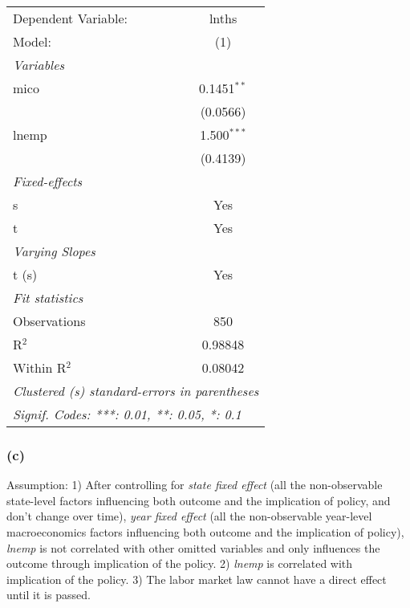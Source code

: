 \documentclass[
]{article}
\begin{document}
\begin{center}\begingroup\centering\begin{tabular}{lc}   \tabularnewline \midrule \midrule   Dependent Variable: & lnths\\     Model:              & (1)\\     \midrule   \emph{Variables}\\   mico                & 0.1451$^{**}$\\                          & (0.0566)\\      lnemp               & 1.500$^{***}$\\                          & (0.4139)\\      \midrule   \emph{Fixed-effects}\\   s                   & Yes\\     t                   & Yes\\     \midrule   \emph{Varying Slopes}\\   t (s)               & Yes\\     \midrule   \emph{Fit statistics}\\   Observations        & 850\\     R$^2$               & 0.98848\\     Within R$^2$        & 0.08042\\     \midrule \midrule   \multicolumn{2}{l}{\emph{Clustered (s) standard-errors in parentheses}}\\   \multicolumn{2}{l}{\emph{Signif. Codes: ***: 0.01, **: 0.05, *: 0.1}}\\\end{tabular}\par\endgroup\end{center}

\hypertarget{c-2}{%
\subsubsection{(c)}\label{c-2}}

Assumption: 1) After controlling for \emph{state fixed effect} (all the
non-observable state-level factors influencing both outcome and the
implication of policy, and don't change over time), \emph{year fixed
effect} (all the non-observable year-level macroeconomics factors
influencing both outcome and the implication of policy), \emph{lnemp} is
not correlated with other omitted variables and only influences the
outcome through implication of the policy. 2) \emph{lnemp} is correlated
with implication of the policy. 3) The labor market law cannot have a
direct effect until it is passed.
\end{document}
